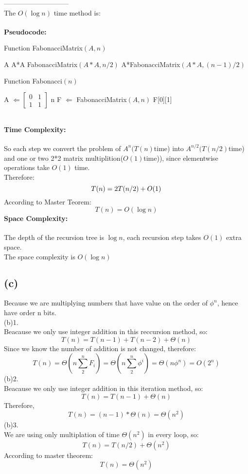 \documentclass{article}
\begin{document}
-----------------------------\\
The $O(\log n)$ time method is:	\\\\
\textbf{\large Pseudocode:}
\begin{algorithm}
  \caption{Function FabonacciMatrix$(A,n)$}
  \label{alg1}
  \begin{algorithmic}
  \RETURN A
  \RETURN A*A
  \RETURN FabonacciMatrix$(A*A,n/2)$
  \RETURN A*FabonacciMatrix$(A*A,(n-1)/2)$
  \ENDIF
  \end{algorithmic}
\end{algorithm}
\begin{algorithm}
  \caption{Function Fabonacci$(n)$}
  \label{alg1}
  \begin{algorithmic}
  \STATE A $\Longleftarrow \begin{bmatrix}
    {0} & {1}\\
    {1} & {1} 
\end{bmatrix}$ 
  \RETURN n
  \ELSE
  \STATE F $\Longleftarrow$ FabonacciMatrix$(A,n)$
  \RETURN F[0][1]
  \ENDIF
  \end{algorithmic}
\end{algorithm}\\
\textbf{\large Time Complexity:}\\\\
So each step we convert the problem of $A^n$$(T(n)$time) into $A^{n/2}$$(T(n/2)$time) and one or two 2*2 matrix multiplition($O(1)$time)), since elementwise operations take $O(1)$ time.\\
Therefore:
$$
T(n)=2T(n/2)+O(1)\\
$$
According to Master Teorem:
$$
T(n)=O (\log n)
$$
\textbf{\large Space Complexity:}\\\\
The depth of the recursion tree is $\log n$, each recursion step takes $O(1)$ extra space.\\
The space complexity is $O(\log n)$

\subsection{(c)}
Because we are multiplying numbers that have value on the order of $\phi^n$, hence have order n bits.\\
(b)1.\\Beacause we only use integer addition in this reccursion method, so:
$$T(n)=T(n-1)+T(n-2)+\Theta(n)$$
Since we know the number of addition is not changed, therefore:
$$T(n)=\Theta(n\sum_2^n F_i)=\Theta(n\sum_2^n \phi^i)=\Theta(n\phi^n)=O(2^n)$$
(b)2.\\Beacause we only use integer addition in this iteration method, so:
$$T(n)=T(n-1)+\Theta(n)$$
Therefore, $$T(n)=(n-1)*\Theta(n)=\Theta(n^2)$$
(b)3.\\We are using only multiplation of time $\Theta(n^2)$ in every loop, so:
$$T(n)=T(n/2)+\Theta(n^2)$$
According to master theorem:
$$T(n)=\Theta(n^2)$$
\end{document}
